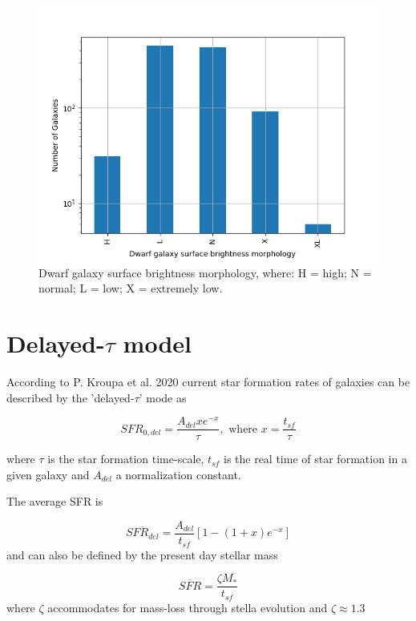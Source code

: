 \documentclass[a4paper,twocolumn]{article}
\begin{document}
\begin{figure}[htbp]
\centering
\includegraphics[width=.9\linewidth]{./figs/hist-Tdw2.png}
\caption{\label{Types of dwarf galaxies brightness}Dwarf galaxy surface brightness morphology, where: H = high; N = normal; L = low; X = extremely low.}
\end{figure}


\section{Delayed-\(\tau\) model}
\label{sec:org5bed0e8}

According to P. Kroupa et al. 2020\autocite{kroupaConstraintsStarFormation2020} current star formation rates of galaxies can be described by the 'delayed-\(\tau\)' mode as


\begin{equation} \label{eq:SFR}
SFR_{0,del}=\frac{A_{del}xe^{-x}}{\tau},\text{ where } x=\frac{t_{sf}}{\tau}
\end{equation}


where \(\tau\) is the star formation time-scale,  \(t_{sf}\) is the real time of star formation in a given galaxy and \(A_{del}\) a normalization constant.

The average SFR is

\begin{equation}\label{eq:av_SFR-x}
\overline{SFR_{del}}=\frac{A_{del}}{t_{sf}}[1-(1+x)e^{-x}]
\end{equation}
and can also be defined by the present day stellar mass

\begin{equation}\label{eq:av_SFR M*}
    \overline{SFR}=\frac{\zeta M_*}{t_{sf}}
\end{equation}
where \(\zeta\) accommodates for mass-loss through stella evolution and \(\zeta\approx 1.3\)
\end{document}
